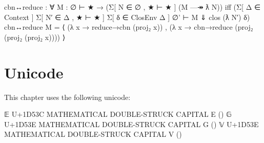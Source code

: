 \begin{fence}
\begin{code}
cbn↔reduce : ∀ {M : ∅ ⊢ ★}
           → (Σ[ N ∈ ∅ , ★ ⊢ ★ ] (M —↠ ƛ N))
             iff
             (Σ[ Δ ∈ Context ] Σ[ N′ ∈ Δ , ★ ⊢ ★ ] Σ[ δ ∈ ClosEnv Δ ]
               ∅' ⊢ M ⇓ clos (ƛ N′) δ)
cbn↔reduce {M} = ⟨ (λ x → reduce→cbn (proj₂ x)) ,
                   (λ x → cbn→reduce (proj₂ (proj₂ (proj₂ x)))) ⟩
\end{code}
\end{fence}

\hypertarget{unicode}{%
\section{Unicode}\label{unicode}}

This chapter uses the following unicode:

\begin{myDisplay}
𝔼  U+1D53C  MATHEMATICAL DOUBLE-STRUCK CAPITAL E (\bE)
𝔾  U+1D53E  MATHEMATICAL DOUBLE-STRUCK CAPITAL G (\bG)
𝕍  U+1D53E  MATHEMATICAL DOUBLE-STRUCK CAPITAL V (\bV)
\end{myDisplay}

